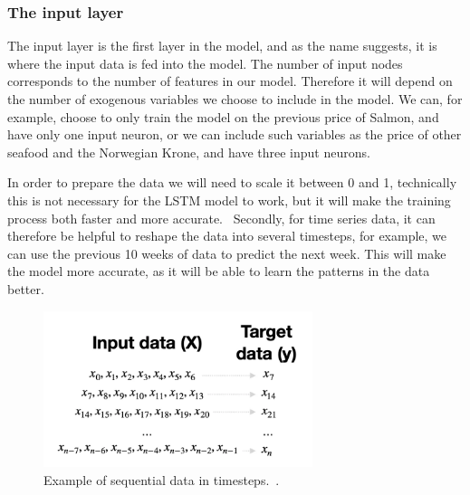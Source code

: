\subsubsection{The input layer}
The input layer is the first layer in the model, and as the name suggests, it is where the input data is fed into the model. The number of input nodes corresponds to the number of features in our model. Therefore it will depend on the number of exogenous variables we choose to include in the model. We can, for example, choose to only train the model on the previous price of Salmon, and have only one input neuron, or we can include such variables as the price of other seafood and the Norwegian Krone, and have three input neurons. 

In order to prepare the data we will need to scale it between 0 and 1, technically this is not necessary for the LSTM model to work, but it will make the training process both faster and more accurate.~\parencite{brownlee_2019} Secondly, for time series data, it can therefore be helpful to reshape the data into several timesteps, for example, we can use the previous 10 weeks of data to predict the next week. This will make the model more accurate, as it will be able to learn the patterns in the data better.
\begin{figure}[H]
    \centering
    \includegraphics[width=0.7\textwidth]{data/Figures/Neural networks/Sequential_data.png}
    \caption[Example of sequential data in timesteps.]{Example of sequential data in timesteps.~\cite{dobilas_2022}.}\label{fig:Sequential_data}
\end{figure}
